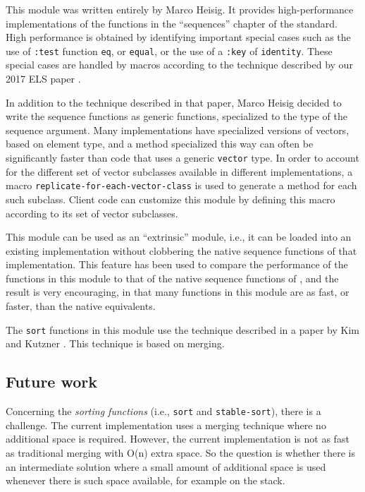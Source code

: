 This module was written entirely by Marco Heisig.  It provides
high-performance implementations of the functions in the ``sequences''
chapter of the \commonlisp{} standard.  High performance is obtained
by identifying important special cases such as the use of
\texttt{:test} function \texttt{eq}, or \texttt{equal}, or the use of
a \texttt{:key} of \texttt{identity}.  These special cases are handled
by macros according to the technique described by our 2017 ELS paper
\cite{Durand:2017:ELS:Sequence}.

In addition to the technique described in that paper, Marco Heisig
decided to write the sequence functions as generic functions,
specialized to the type of the sequence argument.  Many
implementations have specialized versions of vectors, based on element
type, and a method specialized this way can often be significantly
faster than code that uses a generic \texttt{vector} type.  In order
to account for the different set of vector subclasses available in
different \commonlisp{} implementations, a macro
\texttt{replicate-for-each-vector-class} is used to generate a method
for each such subclass.  Client code can customize this module by
defining this macro according to its set of vector subclasses.

This module can be used as an ``extrinsic'' module, i.e., it can be
loaded into an existing \commonlisp{} implementation without
clobbering the native sequence functions of that implementation.  This
feature has been used to compare the performance of the functions in
this module to that of the native sequence functions of \sbcl{}, and
the result is very encouraging, in that many functions in this module
are as fast, or faster, than the native \sbcl{} equivalents.

The \texttt{sort} functions in this module use the technique described
in a paper by Kim and Kutzner \cite{10.1007/978-3-540-30140-0_63}.
This technique is based on merging.

\subsection{Future work}
\label{sec-sequence-functions-future-work}

Concerning the \emph{sorting functions} (i.e., \texttt{sort} and
\texttt{stable-sort}), there is a challenge.  The current
implementation uses a merging technique where no additional space is
required.  However, the current implementation is not as fast as
traditional merging with O(n) extra space.  So the question is whether
there is an intermediate solution where a small amount of additional
space is used whenever there is such space available, for example on
the stack.

